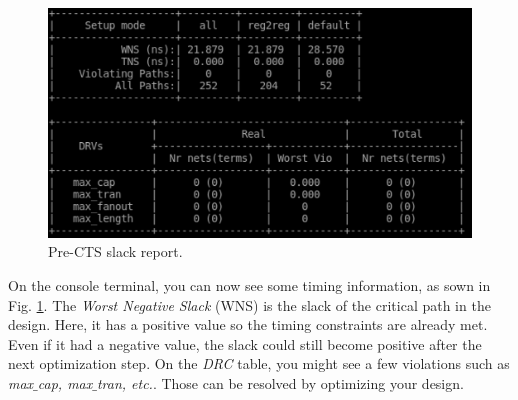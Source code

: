 	\parbox[t]{\dimexpr\textwidth-\leftmargin}{%
	\begin{figure}
		\vspace{0mm}
		\centering
		\vspace{-\baselineskip}
	\includegraphics[scale=0.4]{figures/lab5_backend/timing_prects.pdf}
\caption{Pre-CTS slack report.}
\label{fig_timing_prects}
	\end{figure}
On the console terminal, you can now see some timing information, as sown in Fig. \ref{fig_timing_prects}. The \textit{Worst Negative Slack} (WNS) is the slack of the critical path in the design. Here, it has a positive value so the timing constraints are already met. Even if it had a negative value, the slack could still become positive after the next optimization step. On the \textit{DRC} table, you might see a few violations such as \textit{max$\_$cap, max$\_$tran, etc.}. Those can be resolved by optimizing your design.\\
} 

